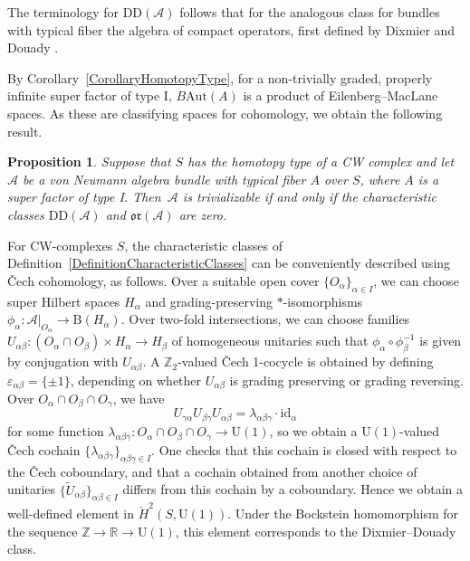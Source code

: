 \documentclass[pdftex]{sigma}
\numberwithin{equation}{section}
\newtheorem{Proposition}[Theorem]{Proposition}
\newcommand{\R}{\mathbb{R}}
\newcommand{\Z}{\mathbb{Z}}
\newcommand{\B}{\mathrm{B}}
\newcommand{\A}{\mathcal{A}}
\newcommand{\Aut}{\mathrm{Aut}}
\newcommand{\U}{\mathrm{U}}
\newcommand{\DD}{\mathrm{DD}}
\newcommand{\oclass}{\mathfrak{or}}
\begin{document}
The terminology for $\DD(\A)$ follows that for the analogous class for bundles with typical fiber the algebra of compact operators, first defined by Dixmier and Douady \cite{DixmierDouady}.

By Corollary~\ref{CorollaryHomotopyType}, for a non-trivially graded, properly infinite super factor of type I, $B\Aut(A)$ is a product of Eilenberg--MacLane spaces.
As these are classifying spaces for cohomology, we obtain the following result.

\begin{Proposition}
Suppose that $S$ has the homotopy type of a CW complex and let $\A$ be a von Neumann algebra bundle with typical fiber $A$ over $S$, where $A$ is a super factor of type I.
Then~$\A$ is trivializable if and only if the characteristic classes $\DD(\A)$ and $\oclass(\A)$ are zero.
\end{Proposition}

\begin{Remark} \label{RemarkCheckPicture}
For CW-complexes $S$, the characteristic classes of Definition~\ref{DefinitionCharacteristicClasses} can be conveniently described using \v{C}ech cohomology, as follows.
Over a suitable open cover $\{O_\alpha\}_{\alpha \in I}$, we can choose super Hilbert spaces $H_\alpha$ and grading-preserving $*$-isomorphisms $\phi_\alpha\colon \mathcal{A}|_{O_\alpha} \to \B(H_\alpha)$.
Over two-fold intersections, we can choose families $U_{\alpha\beta}\colon (O_\alpha \cap O_\beta) \times H_\alpha \to H_\beta$ of homogeneous unitaries such that $\phi_\alpha \circ \phi_\beta^{-1}$ is given by conjugation with $U_{\alpha\beta}$.
A $\Z_2$-valued \v{C}ech 1-cocycle is obtained by defining $\varepsilon_{\alpha\beta} = \{\pm 1\}$, depending on whether $U_{\alpha\beta}$ is grading preserving or grading reversing.
Over $O_\alpha \cap O_\beta \cap O_\gamma$, we have
\begin{equation*}
U_{\gamma \alpha} U_{\beta\gamma} U_{\alpha\beta} = \lambda_{\alpha\beta\gamma} \cdot \mathrm{id}_\alpha
\end{equation*}
for some function $\lambda_{\alpha\beta\gamma} \colon O_\alpha \cap O_\beta \cap O_\gamma \to \U(1)$, so we obtain a $\U(1)$-valued \v{C}ech cochain $\{\lambda_{\alpha\beta\gamma}\}_{\alpha\beta\gamma\in I}$.
One checks that this cochain is closed with respect to the \v{C}ech coboundary, and that a cochain obtained from another choice of unitaries $\{\tilde{U}_{\alpha\beta}\}_{\alpha \beta \in I}$ differs from this cochain by a coboundary.
Hence we obtain a well-defined element in $\check{H}^2(S, \U(1))$.
Under the Bockstein homomorphism for the sequence $\Z \to \R \to \U(1)$, this element corresponds to the Dixmier--Douady class.
\end{Remark}
\end{document}
